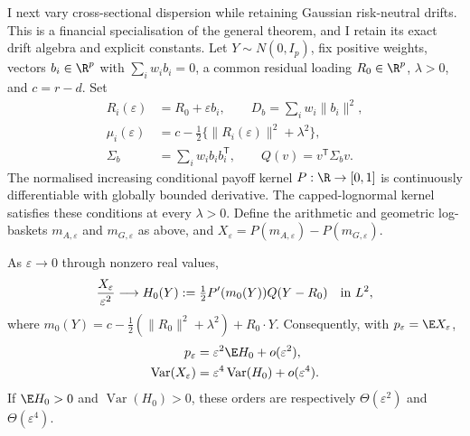 I next vary cross-sectional dispersion while retaining Gaussian
risk-neutral drifts. This is a financial specialisation of the general
theorem, and I retain its exact drift algebra and explicit constants.
Let $Y\sim N(0,I_p)$, fix positive weights, vectors
$b_i\in\R^p$ with $\sum_iw_i b_i=0$, a common residual loading
$R_0\in\R^p$, $\lambda>0$, and $c=r-d$. Set
\begin{align}
 R_i(\varepsilon)&=R_0+\varepsilon b_i,\qquad
 D_b=\sum_iw_i\|b_i\|^2,\\
 \mu_i(\varepsilon)&=c-\tfrac12\{
           \|R_i(\varepsilon)\|^2+\lambda^2\},\\
 \Sigma_b&=\sum_iw_i b_i b_i^{\mathsf T},\qquad
 Q(v)=v^{\mathsf T}\Sigma_b v.
\end{align}
The normalised increasing conditional payoff kernel $P:\R\to[0,1]$ is
continuously differentiable with globally bounded derivative.
The capped-lognormal kernel satisfies these conditions at every
$\lambda>0$. Define the arithmetic and geometric log-baskets
$m_{A,\varepsilon}$ and $m_{G,\varepsilon}$ as above, and
$X_\varepsilon=P(m_{A,\varepsilon})-P(m_{G,\varepsilon})$.

\begin{theorem}\label{thm:weak-dispersion}
As $\varepsilon\to0$ through nonzero real values,
\begin{equation}\label{eq:weak-L2}
 \frac{X_\varepsilon}{\varepsilon^2}
 \longrightarrow
 H_0(Y):=\tfrac12P'(m_0(Y))Q(Y-R_0)
 \quad\hbox{in }L^2,
\end{equation}
where
$m_0(Y)=c-\tfrac12(\|R_0\|^2+\lambda^2)+R_0\cdot Y$.
Consequently, with $p_\varepsilon=\E X_\varepsilon$,
\begin{align}
 p_\varepsilon&=\varepsilon^2\E H_0+o(\varepsilon^2),\\
 \operatorname{Var}(X_\varepsilon)
   &=\varepsilon^4\operatorname{Var}(H_0)+o(\varepsilon^4).
\end{align}
If $\E H_0>0$ and $\operatorname{Var}(H_0)>0$, these orders are
respectively $\Theta(\varepsilon^2)$ and $\Theta(\varepsilon^4)$.
\end{theorem}

